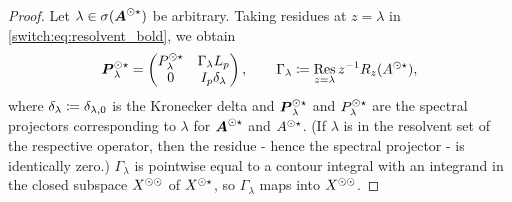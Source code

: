 \begin{proof}
  Let $\lambda \in \sigma(\boldsymbol{A}^{\odot\star})$ be arbitrary. Taking residues at $z = \lambda$ in \cref{switch:eq:resolvent_bold}, we obtain
  \begin{equation}
    \label{switch:eq:P_bold}
    \boldsymbol{P}_{\lambda}^{\odot\star} =
    \begin{pmatrix}
      P_{\lambda}^{\odot\star}& \Gamma_{\lambda}L_p\\
      0& I_p\delta_{\lambda}
    \end{pmatrix}, \qquad \Gamma_{\lambda} \coloneqq \operatorname*{Res}_{z=\lambda}{z^{-1}R_z(A^{\odot\star})},
  \end{equation}
  where $\delta_{\lambda} \coloneqq \delta_{\lambda,0}$ is the Kronecker delta and $\boldsymbol{P}_{\lambda}^{\odot\star}$ and $P_{\lambda}^{\odot\star}$ are the spectral projectors corresponding to $\lambda$ for $\boldsymbol{A}^{\odot\star}$ and $A^{\odot\star}$. (If $\lambda$ is in the resolvent set of the respective operator, then the residue - hence the spectral projector - is identically zero.) $\Gamma_{\lambda}$ is pointwise equal to a contour integral with an integrand in the closed subspace $X^{\odot\odot}$ of $X^{\odot\star}$, so $\Gamma_{\lambda}$ maps into $X^{\odot\odot}$.


\end{proof}
